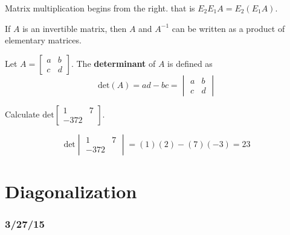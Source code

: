 \documentclass[english, 12pt]{article}
\begin{document}
\begin{qte}
Matrix multiplication begins from the right. that is $E_2E_1A = E_2(E_1A)$.
\end{qte}

\begin{thrm}
If $A$ is an invertible matrix, then $A$ and $A^{-1}$ can be written as a product of elementary matrices.
\end{thrm}

\begin{defn}
Let $A = \begin{bmatrix} a & b \\ c & d \end{bmatrix}$. The \textbf{determinant} of $A$ is defined as
\[\text{det}(A) = ad-bc = \begin{vmatrix} a & b \\ c & d \end{vmatrix}\]
\end{defn}

\begin{exmp}
Calculate $\text{det}\begin{bmatrix} 1 & 7 \\ -3 7 2 \end{bmatrix}$.
\begin{sol}
\[\text{det}\begin{vmatrix} 1 & 7 \\ -3 7 2 \end{vmatrix} = (1)(2) - (7)(-3) = 23\]
\end{sol}
\end{exmp}


\section{Diagonalization}


\subsubsection*{3/27/15}
\end{document}
